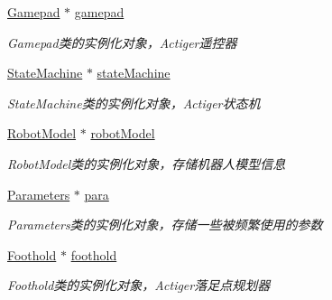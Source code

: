 \begin{DoxyCompactItemize}
\mbox{\label{classquadruped_1_1MotionPlan_a9de493b6d7cfeb7820cfbcbfc75a7664}} 
\hyperlink{classquadruped_1_1Gamepad}{Gamepad} $\ast$ \hyperlink{classquadruped_1_1MotionPlan_a9de493b6d7cfeb7820cfbcbfc75a7664}{gamepad}
\begin{DoxyCompactList}\small\item\em Gamepad类的实例化对象，\+Actiger遥控器 \end{DoxyCompactList}\item 
\mbox{\label{classquadruped_1_1MotionPlan_a55aa8bfff1dc59cf60459d3e110218c1}} 
\hyperlink{classquadruped_1_1StateMachine}{State\+Machine} $\ast$ \hyperlink{classquadruped_1_1MotionPlan_a55aa8bfff1dc59cf60459d3e110218c1}{state\+Machine}
\begin{DoxyCompactList}\small\item\em State\+Machine类的实例化对象，\+Actiger状态机 \end{DoxyCompactList}\item 
\mbox{\label{classquadruped_1_1MotionPlan_aa1bc9af0d38eb216f38f5a522e299b65}} 
\hyperlink{classquadruped_1_1RobotModel}{Robot\+Model} $\ast$ \hyperlink{classquadruped_1_1MotionPlan_aa1bc9af0d38eb216f38f5a522e299b65}{robot\+Model}
\begin{DoxyCompactList}\small\item\em Robot\+Model类的实例化对象，存储机器人模型信息 \end{DoxyCompactList}\item 
\mbox{\label{classquadruped_1_1MotionPlan_a89e7b9a6130d9fc312a407c97017c56f}} 
\hyperlink{classquadruped_1_1Parameters}{Parameters} $\ast$ \hyperlink{classquadruped_1_1MotionPlan_a89e7b9a6130d9fc312a407c97017c56f}{para}
\begin{DoxyCompactList}\small\item\em Parameters类的实例化对象，存储一些被频繁使用的参数 \end{DoxyCompactList}\item 
\mbox{\label{classquadruped_1_1MotionPlan_a7ea20a7cfb4c72e7f37be61676840705}} 
\hyperlink{classquadruped_1_1Foothold}{Foothold} $\ast$ \hyperlink{classquadruped_1_1MotionPlan_a7ea20a7cfb4c72e7f37be61676840705}{foothold}
\begin{DoxyCompactList}\small\item\em Foothold类的实例化对象，\+Actiger落足点规划器 \end{DoxyCompactList}\item 

\end{DoxyCompactItemize}
